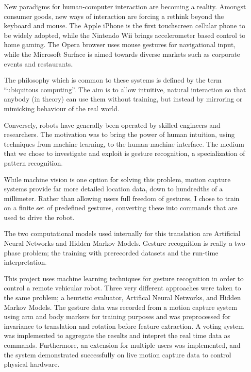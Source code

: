\documentclass[12pt,a4,notitlepage]{report}
\renewcommand{\_}{\texttt{\symbol{95}}}
\newcommand{\<}{\texttt{\symbol{60}}}
\renewcommand{\>}{\texttt{\symbol{62}}}
\begin{document}
New paradigms for human-computer interaction are becoming a reality. Amongst consumer goods, new ways of interaction are forcing a rethink beyond the keyboard and mouse. The Apple iPhone is the first touchscreen cellular phone to be widely adopted, while the Nintendo Wii brings accelerometer based control to home gaming. The Opera browser uses mouse gestures for navigational input, while the Microsoft Surface is aimed towards diverse markets such as corporate events and restaurants.

The philosophy which is common to these systems is defined by the term ``ubiquitous computing''. The aim is to allow intuitive, natural interaction so that anybody (in theory) can use them without training, but instead by mirroring or mimicking behaviour of the real world.

Conversely, robots have generally been operated by skilled engineers and researchers. The motivation was to bring the power of human intuition, using techniques from machine learning, to the human-machine interface. The medium that we chose to investigate and exploit is gesture recognition, a specialization of pattern recognition.

While machine vision is one option for solving this problem, motion capture systems provide far more detailed location data, down to hundredths of a millimeter. Rather than allowing users full freedom of gestures, I chose to train on a finite set of predefined gestures, converting these into commands that are used to drive the robot. 

The two computational models used internally for this translation are Artificial Neural Networks and Hidden Markov Models. Gesture recognition is really a two-phase problem; the training with prerecorded datasets and the run-time interpretation. 

This project uses machine learning techniques for gesture recognition in order to control a remote vehicular robot. Three very different approaches were taken to the same problem; a heuristic evaluator, Artifical Neural Networks, and Hidden Markov Models. The gesture data was recorded from a motion capture system using arm and body markers for training purposes and was preprocessed for invariance to translation and rotation before feature extraction. A voting system was implemented to aggregate the results and intepret the real time data as commands. Furthermore, an extension for multiple users was implemented, and the system demonstrated successfully on live motion capture data to control physical hardware.
\end{document}

